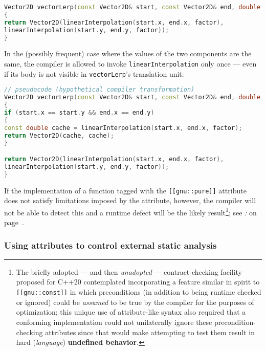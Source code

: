 \begin{lstlisting}[language=C++]
Vector2D vectorLerp(const Vector2D& start, const Vector2D& end, double factor)
{
return Vector2D(linearInterpolation(start.x, end.x, factor),
linearInterpolation(start.y, end.y, factor));
}
\end{lstlisting}
\pagebreak%

\noindent In the (possibly frequent) case where the values of the two components
are the same, the compiler is allowed to invoke
\texttt{linearInterpolation} only once --- even if its body is not
visible in \texttt{vectorLerp}'s translation unit:

\begin{lstlisting}[language=C++]
// pseudocode (hypothetical compiler transformation)
Vector2D vectorLerp(const Vector2D& start, const Vector2D& end, double factor)
{
if (start.x == start.y && end.x == end.y)
{
const double cache = linearInterpolation(start.x, end.x, factor);
return Vector2D(cache, cache);
}

return Vector2D(linearInterpolation(start.x, end.x, factor),
linearInterpolation(start.y, end.y, factor));
}
\end{lstlisting}

\noindent If the implementation of a function tagged with the
\texttt{[[gnu::pure]]} attribute does not satisfy limitations imposed by
the attribute, however, the compiler will not be able to detect this and a runtime
defect will be the likely result{\cprotect\footnote{The briefly adopted
--- and then \emph{unadopted} --- contract-checking facility proposed
for C++20 contemplated incorporating a feature similar in spirit to
\texttt{[[gnu::const]]} in which preconditions (in addition to being
runtime checked or ignored) could be \emph{assumed} to be true by the
compiler for the purposes of optimization; this unique use of
attribute-like syntax also required that a conforming implementation
could not unilaterally ignore these precondition-checking attributes
since that would make attempting to test them result in hard
(\emph{language}) \textbf{undefined behavior}.}}; see
{\it{}:} {\it{}} on page~\pageref{some-attributes,-if-misused,-can-affect-program-correctness}.

\subsubsection[Using attributes to control external static analysis]{Using attributes to control external static analysis}\label{using-attributes-to-control-external-static-analysis}

